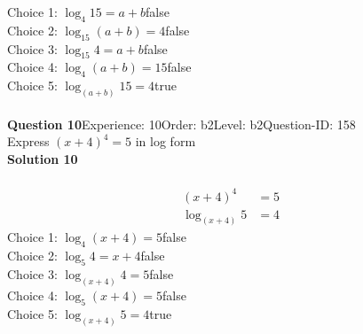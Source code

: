 \documentclass{article}
\begin{document}
Choice 1: \hspace{20pt}$\log_{4}15=a+b$\hspace{20pt}false\\
Choice 2: \hspace{20pt}$\log_{15}(a+b)=4$\hspace{20pt}false\\
Choice 3: \hspace{20pt}$\log_{15}4=a+b$\hspace{20pt}false\\
Choice 4: \hspace{20pt}$\log_{4}(a+b)=15$\hspace{20pt}false\\
Choice 5: \hspace{20pt}$\log_{(a+b)}15=4$\hspace{20pt}true\\
\\[4pt]
\noindent\textbf{Question 10}\hspace{20pt}Experience: 10\hspace{20pt}Order: b2\hspace{20pt}Level: b2\hspace{20pt}Question-ID: 158\\[2pt]
Express $(x+4)^4=5$ in log form\\[4pt]
\noindent\textbf{Solution 10}\\[2pt]
\\[-35pt]\begin{align*}
(x+4)^4&=5\\[2pt]
\log_{(x+4)}5&=4
\end{align*}
Choice 1: \hspace{20pt}$\log_{4}(x+4)=5$\hspace{20pt}false\\
Choice 2: \hspace{20pt}$\log_{5}4=x+4$\hspace{20pt}false\\
Choice 3: \hspace{20pt}$\log_{(x+4)}4=5$\hspace{20pt}false\\
Choice 4: \hspace{20pt}$\log_{5}(x+4)=5$\hspace{20pt}false\\
Choice 5: \hspace{20pt}$\log_{(x+4)}5=4$\hspace{20pt}true\\
\\[4pt]
\end{document}
